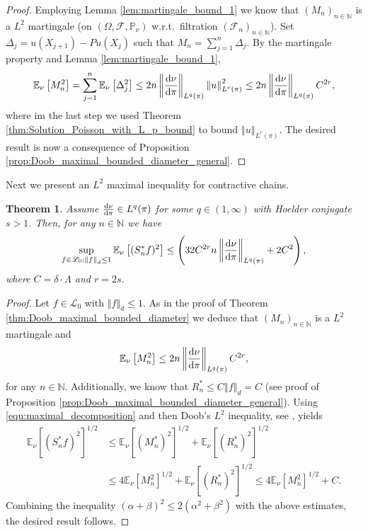 \documentclass[12pt]{article}
\theoremstyle{plain}
\newtheorem{thm}{Theorem}[section]
\renewcommand{\d}{{\rm d}}
\newcommand{\norm}[1]{\left\Vert #1 \right\Vert}
\newcommand{\N}{\mathbb{N}}
\newcommand{\E}{\mathbb{E}}
\begin{document}
{\begin{proof}
Employing Lemma \ref{lem:martingale_bound_1} we know that $(M_n)_{n \in \N}$ is a $L^2$ martingale (on $(\Omega, \mathcal{F}, \mathbb{P}_\nu)$ w.r.t.~filtration $(\mathcal{F}_n)_{n \in \N}$). 
Set $\Delta_j = u(X_{j+1}) -Pu(X_j) $ such that $M_n = \sum_{j=1}^n \Delta_j$.
By the martingale property and Lemma \ref{lem:martingale_bound_1}, 
\[
\E_\nu\left[M_n^2\right]= 
\sum_{j=1}^n\E_\nu \left[\Delta_j^2 \right]
\leq 2n\norm{\frac{\d \nu}{\d \pi}}_{L^q(\pi)} \norm{u}_{L^r(\pi)}^2
\leq 
2n\norm{\frac{\d \nu}{\d \pi}}_{L^q(\pi)} C^{2r},
\]
where im the last step we used Theorem \ref{thm:Solution_Poisson_with_L_p_bound} to bound $\norm{u}_{L^r(\pi)}$.
The desired result is now a consequence of Proposition \ref{prop:Doob_maximal_bounded_diameter_general}.
\end{proof}



Next we present an $L^2$ maximal inequality for contractive chains. 
\begin{thm}\label{thm:L_2_maximal_inequality_bounded_diameter}
Assume $\frac{\d\nu}{\d\pi}\in L^q(\pi)$ for some $q \in (1, \infty)$ with Hoelder conjugate $s>1$.
Then, for any $n \in \N$  we have 
\[
\sup_{f \in \mathscr{L}_0; \norm{f}_d \leq 1} \E_\nu\left[(S_n^*f)^2\right] \leq \left(32C^{2r}n\norm{\frac{\d \nu}{\d \pi}}_{L^q(\pi)}  + 2C^2 \right),
\]
where $C= \delta \cdot \Lambda$ and $r = 2s$.
\end{thm}

\begin{proof}
Let $f\in \mathscr{L}_0$ with $\norm{f}_d \leq 1$.  
As in the proof of Theorem \ref{thm:Doob_maximal_bounded_diameter} we deduce that $(M_n)_{n \in \N}$ is a $L^2$ martingale and 
\[
\E_\nu\left[M_n^2\right] \leq 2n\norm{\frac{\d \nu}{\d \pi}}_{L^q(\pi)} C^{2r},
\]
for any $n \in \N$. 
Additionally, we know that $R_n^* \leq C \norm{f}_d = C $ (see proof of Proposition \ref{prop:Doob_maximal_bounded_diameter_general}).
Using \eqref{equ:maximal_decomposition} and then Doob's $L^2$ inequality, see \cite{revuz1999continuous}, yields  
\begin{align*}
\E_\nu\left[(S_n^*f)^2 \right]^{1/2} &\leq \E_\nu\left[ (M_n^*)^2 \right]^{1/2} + \E_\nu\left[(R_n^*)^2\right]^{1/2} \\
&\leq 4\E_\nu\left[M_n^2\right]^{1/2} + \E_\nu\left[(R_n^*)^2\right]^{1/2}  \leq 4\E_\nu\left[M_n^2\right]^{1/2} + C.
\end{align*}
Combining the inequality $(\alpha+\beta)^2 \leq 2(\alpha^2+\beta^2)$ with the above estimates, the desired result follows. 
\end{proof}

}
\end{document}
